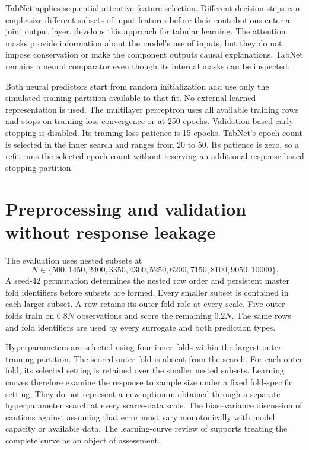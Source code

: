 TabNet applies sequential attentive feature selection. Different decision steps can emphasize different subsets of input features before their contributions enter a joint output layer. \citet{ArikPfister2021} develops this approach for tabular learning. The attention masks provide information about the model's use of inputs, but they do not impose conservation or make the component outputs causal explanations. TabNet remains a neural comparator even though its internal masks can be inspected.

Both neural predictors start from random initialization and use only the simulated training partition available to that fit. No external learned representation is used. The multilayer perceptron uses all available training rows and stops on training-loss convergence or at 250 epochs. Validation-based early stopping is disabled. Its training-loss patience is 15 epochs. TabNet's epoch count is selected in the inner search and ranges from 20 to 50. Its patience is zero, so a refit runs the selected epoch count without reserving an additional response-based stopping partition.

\section{Preprocessing and validation without response leakage}

The evaluation uses nested subsets at
\begin{equation}
N\in\{500,1450,2400,3350,4300,5250,6200,7150,8100,9050,10000\}.
\label{eq:reactor_nested_sample_sizes}
\end{equation}
A seed-42 permutation determines the nested row order and persistent master fold identifiers before subsets are formed. Every smaller subset is contained in each larger subset. A row retains its outer-fold role at every scale. Five outer folds train on $0.8N$ observations and score the remaining $0.2N$. The same rows and fold identifiers are used by every surrogate and both prediction types.

Hyperparameters are selected using four inner folds within the largest outer-training partition. The scored outer fold is absent from the search. For each outer fold, its selected setting is retained over the smaller nested subsets. Learning curves therefore examine the response to sample size under a fixed fold-specific setting. They do not represent a new optimum obtained through a separate hyperparameter search at every scarce-data scale. The bias--variance discussion of \citet{Belkin2019} cautions against assuming that error must vary monotonically with model capacity or available data. The learning-curve review of \citet{VieringLoog2023} supports treating the complete curve as an object of assessment.

